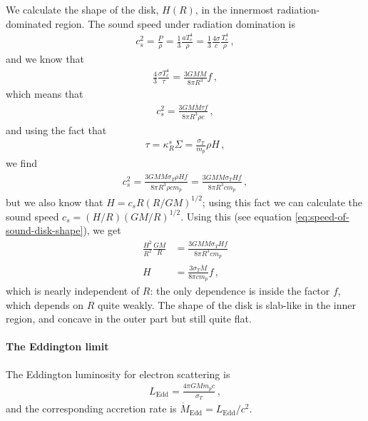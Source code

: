 \documentclass[main.tex]{subfiles}
\begin{document}
We calculate the shape of the disk, \(H(R)\), in the innermost radiation-dominated region.
The sound speed under radiation domination is
%
\begin{align}
c_s^2 = \frac{P}{\rho } = \frac{1}{3} \frac{a T_c^{4}}{\rho} = \frac{1}{3} \frac{4 \sigma }{c} \frac{T_c^{4}}{\rho }
\,,
\end{align}
%
and we know that 
%
\begin{align}
\frac{4}{3} \frac{\sigma T_c^{4}}{\tau } = \frac{3 GM \dot{M}}{8 \pi R^3} f
\,,
\end{align}
%
which means that 
%
\begin{align}
c_s^2 = \frac{3 GM \dot{M} \tau f}{8 \pi R^3 \rho c}
\,,
\end{align}
%
and using the fact that 
%
\begin{align}
\tau = \kappa _R^{s} \Sigma = \frac{\sigma _T}{m_p} \rho H
\,,
\end{align}
%
we find 
%
\begin{align}
c_s^2 =  
\frac{3 GM \dot{M} \sigma _T \rho H f}{8 \pi R^3 \rho  c m_p} =
\frac{3 GM \dot{M} \sigma _T  H f}{8 \pi R^3   c m_p}
\,,
\end{align}
%
but we also know that \(H = c_s R (R / GM)^{1/2}\); using this fact we can calculate the sound speed \(c_s = (H/R)(GM/R)^{1/2} \). 
Using this (see equation \eqref{eq:speed-of-sound-disk-shape}), we get 
%
\begin{align}
\frac{H^2}{R^2} \frac{GM}{R} &= \frac{3 GM \dot{M} \sigma _T  H f}{8 \pi R^3   c m_p} \\
H &= \frac{3 \sigma _T \dot{M} }{8 \pi c m_p}f 
\,,
\end{align}
%
which is nearly independent of \(R\): the only dependence is inside the factor \(f\), which depends on \(R\) quite weakly. 
The shape of the disk is slab-like in the inner region, and concave in the outer part but still quite flat. 

\paragraph{The Eddington limit}

The Eddington luminosity for electron scattering is 
%
\begin{align}
L _{\text{Edd}} = \frac{4 \pi G M m_p c}{\sigma _T}
\,,
\end{align}
%
and the corresponding accretion rate is \(\dot{M} _{\text{Edd}} = L _{\text{Edd}} / c^2\). 
\end{document}
